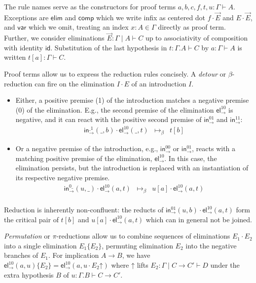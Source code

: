 \documentclass[a4paper]{easychair}
\newcommand{\tid}{\mathsf{id}}
\newcommand{\tcomp}{\mathsf{comp}}
\newcommand{\telim}{\mathsf{elim}}
\newcommand{\tvar}{\mathsf{var}}
\newcommand{\tin}{\ensuremath{\mathsf{in}}}
\newcommand{\inn}[2]{\ensuremath{\tin_{#1}^{#2}}}
\newcommand{\tel}{\mathsf{el}}
\newcommand{\el}[2]{\ensuremath{\tel_{#1}^{#2}}}
\newcommand{\contract}[1][]{\mapsto_{#1}}
\newcommand{\up}{\mathord{\uparrow}}
\begin{document}
The rule names serve as the constructors for proof terms $a,b,c,f,t,u : \Gamma
\vdash A$.  Exceptions are
$\telim$ and $\tcomp$ which we write infix as centered dot $f \cdot
\vec E$ and $E \cdot \vec E$, and
$\tvar$ which we omit, treating an index $x : A \in \Gamma$ directly
as proof term.  Further, we consider eliminations $\vec E : \Gamma
\mid A \vdash C$ up to
associativity of composition with identity $\tid$.
Substitution of the last hypothesis in $t : \Gamma.A \vdash C$ by $a :
\Gamma \vdash A$ is written $t[a] : \Gamma \vdash C$.

Proof terms allow us to express the reduction rules concisely.  A
\emph{detour} or $\beta$-reduction can fire on the elimination $I
\cdot E$ of an introduction $I$.
\begin{itemize}
\item
Either, a
positive premise (1) of the introduction matches a negative premise
(0) of the elimination.  E.g., the second
premise of the elimination $\el\to{10}$
is negative, and it can react with the
positive second premise of $\inn\to{01}$ and $\inn\to{11}$:
\[
\begin{array}{lll}
  \inn\to{\_1}(\_,b) \cdot \el\to{10}(\_,t)
    & \contract[\beta] &
  t[b]
\end{array}
\]

\item
Or a negative premise of the introduction, e.g., $\inn\to{00}$ or
$\inn\to{01}$, reacts with
a matching positive premise of the elimination, $\el\to{10}$.
In this case, the
elimination persists, but the introduction is replaced with an
instantiation of its respective negative premise.
\[
\begin{array}{lll}
  \inn\to{0\_}(u,\_) \cdot \el\to{10}(a,t)
    & \contract[\beta] &
  u[a] \cdot \el\to{10}(a,t)
\\
\end{array}
\]
\end{itemize}
Reduction is inherently non-confluent: the reducts of
$\inn\to{01}(u,b) \cdot \el\to{10}(a,t)$ form the critical pair
of $t[b]$ and  $u[a] \cdot \el\to{10}(a,t)$ which can in general not be
joined.

\emph{Permutation} or $\pi$-reductions allow us to combine sequences
of eliminations $E_1 \cdot E_2$ into a single elimination
$E_1\{E_2\}$, permuting elimination $E_2$ into the negative branches
of $E_1$.  For implication $A \to B$, we have $\el\to{10}(a,u) \{ E_2 \} =
\el\to{10}(a,u \cdot E_2 \up)$ where $\up$ lifts $E_2 : \Gamma \mid C
\to C' \vdash D$ under the extra hypothesis $B$ of $u : \Gamma.B \vdash
C \to C'$.
\end{document}
